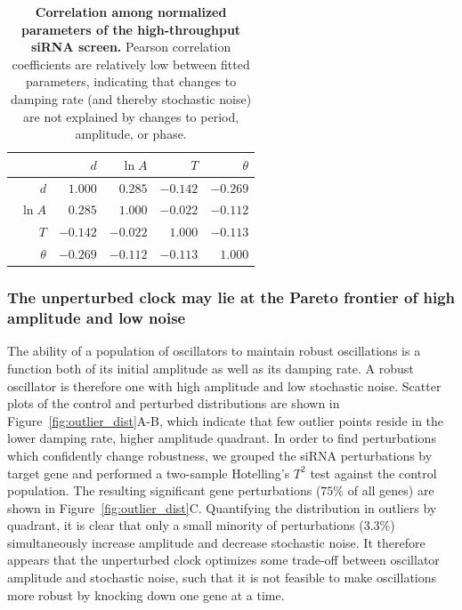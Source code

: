 \documentclass[11pt, letterpaper]{article}
\begin{document}
\begin{table}
  \begin{center}
    \begin{tabular}{rrrrr}
      \toprule
      {}       & $d$    & $\ln A$ & $T$    & $\theta$ \\\midrule
      $d$      & $1.000 $ & $0.285 $  & $-0.142$ & $-0.269$\\\
      $\ln A$  & $0.285 $ & $1.000 $  & $-0.022$ & $-0.112$\\
      $T$      & $-0.142$ & $-0.022$  & $1.000 $ & $-0.113$\\
      $\theta$ & $-0.269$ & $-0.112$  & $-0.113$ & $1.000 $\\
      \bottomrule
    \end{tabular}
  \end{center}
  \caption{{\bfseries Correlation among normalized parameters of the high-throughput siRNA screen.} Pearson correlation coefficients are relatively low between fitted parameters, indicating that changes to damping rate (and thereby stochastic noise) are not explained by changes to period, amplitude, or phase.}
  \label{tab:corr}
\end{table}


\subsubsection*{The unperturbed clock may lie at the Pareto frontier of high amplitude and low noise}

The ability of a population of oscillators to maintain robust oscillations is a function both of its initial amplitude as well as its damping rate.
A robust oscillator is therefore one with high amplitude and low stochastic noise.
Scatter plots of the control and perturbed distributions are shown in Figure~\ref{fig:outlier_dist}A-B, which indicate that few outlier points reside in the lower damping rate, higher amplitude quadrant.
In order to find perturbations which confidently change robustness, we grouped the siRNA perturbations by target gene and performed a two-sample Hotelling's $T^2$ test against the control population.
The resulting significant gene perturbations ($75\%$ of all genes) are shown in Figure~\ref{fig:outlier_dist}C.
Quantifying the distribution in outliers by quadrant, it is clear that only a small minority of perturbations ($3.3\%$) simultaneously increase amplitude and decrease stochastic noise.
It therefore appears that the unperturbed clock optimizes some trade-off between oscillator amplitude and stochastic noise, such that it is not feasible to make oscillations more robust by knocking down one gene at a time.
\end{document}
